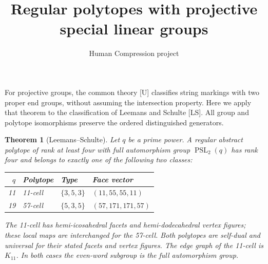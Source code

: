 \documentclass[11pt,a4paper]{article}
\title{Regular polytopes with projective special linear groups}
\author{Human Compression project}
\date{}
\newtheorem{theorem}{Theorem}
\begin{document}
\maketitle

For projective groups, the common theory [U] classifies string markings with two proper end
groups, without assuming the intersection property. Here we apply that
theorem to the classification of Leemans and Schulte [LS]. All group and
polytope isomorphisms preserve the ordered distinguished generators.

\begin{theorem}[Leemans--Schulte]
Let $q$ be a prime power. A regular abstract polytope of rank at least
four with full automorphism group $\operatorname{PSL}_2(q)$ has rank four
and belongs to exactly one of the following two classes:
\begin{center}
\begin{tabular}{rlll}
\toprule
$q$ & Polytope & Type & Face vector\\
\midrule
11 & 11-cell & $\{3,5,3\}$ & $(11,55,55,11)$\\
19 & 57-cell & $\{5,3,5\}$ & $(57,171,171,57)$\\
\bottomrule
\end{tabular}
\end{center}
The 11-cell has hemi-icosahedral facets and hemi-dodecahedral vertex
figures; these local maps are interchanged for the 57-cell. Both polytopes
are self-dual and universal for their stated facets and vertex figures.
The edge graph of the 11-cell is $K_{11}$. In both cases the even-word
subgroup is the full automorphism group.
\end{theorem}
\end{document}
